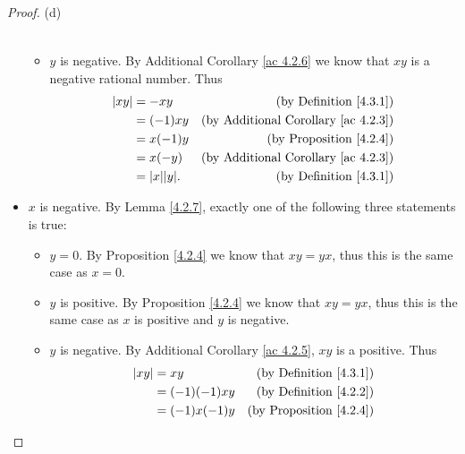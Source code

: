 \begin{proof}{(d)}
\begin{itemize}
\begin{itemize}
\begin{align*}
                        \end{align*}
                  \item \(y\) is negative.
                        By Additional Corollary \ref{ac 4.2.6} we know that \(xy\) is a negative rational number.
                        Thus
                        \begin{align*}
                            \abs*{xy} & = -xy                & \text{(by Definition \ref{4.3.1})}              \\
                                      & = (-1)xy             & \text{(by Additional Corollary \ref{ac 4.2.3})} \\
                                      & = x(-1)y             & \text{(by Proposition \ref{4.2.4})}             \\
                                      & = x(-y)              & \text{(by Additional Corollary \ref{ac 4.2.3})} \\
                                      & = \abs*{x} \abs*{y}. & \text{(by Definition \ref{4.3.1})}              \\
                        \end{align*}
              \end{itemize}
        \item \(x\) is negative.
              By Lemma \ref{4.2.7}, exactly one of the following three statements is true:
              \begin{itemize}
                  \item \(y = 0\).
                        By Proposition \ref{4.2.4} we know that \(xy = yx\), thus this is the same case as \(x = 0\).
                  \item \(y\) is positive.
                        By Proposition \ref{4.2.4} we know that \(xy = yx\), thus this is the same case as \(x\) is positive and \(y\) is negative.
                  \item \(y\) is negative.
                        By Additional Corollary \ref{ac 4.2.5}, \(xy\) is a positive.
                        Thus
                        \begin{align*}
                            \abs*{xy} & = xy                 & \text{(by Definition \ref{4.3.1})}              \\
                                      & = (-1)(-1)xy         & \text{(by Definition \ref{4.2.2})}              \\
                                      & = (-1)x(-1)y         & \text{(by Proposition \ref{4.2.4})}             \\

\end{align*}
\end{itemize}
\end{itemize}
\end{proof}
